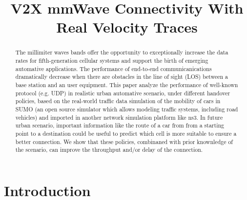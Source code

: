 \documentclass[conference,10pt]{IEEEtran}
\begin{document}
\title{V2X mmWave Connectivity With Real Velocity Traces}

\author{
}

\maketitle

\begin{abstract}
The millimiter waves bands offer the opportunity to exceptionally increase the data rates for fifth-generation cellular systems and support the birth of emerging automative applications. The performance of end-to-end communicanications dramatically decrease when there are obstacles in the line of sight (LOS) between a base station and an user equipment.
This paper analyze the performance of well-known protocol (e.g. UDP) in realistic urban automative scenario, under different handover policies, based on the real-world traffic data simulation of the mobility of cars in SUMO (an open source simulator which allows modeling traffic systems, including road vehicles) and imported in another network simulation platform like ns3. In future urban scenario, important information like the route of a car from from a starting point to a destination could be useful to predict which cell is more suitable to ensure a better connection. We show that these policies, combinaned with prior knownledge of the scenario, can improve the throughput and/or delay of the connection.
\end{abstract}

\section{Introduction}\label{sec:intro}
\end{document}
